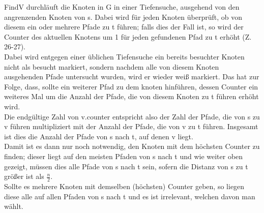 \documentclass[fleqn]{article}
\begin{document}
FindV durchläuft die Knoten in G in einer Tiefensuche, ausgehend von den angrenzenden Knoten von s. Dabei wird für jeden Knoten überprüft, ob von diesem ein oder mehrere Pfade zu t führen; falls dies der Fall ist, so wird der Counter des aktuellen Knotens um 1 für jeden gefundenen Pfad zu t erhöht (Z. 26-27). \\
Dabei wird entgegen einer üblichen Tiefensuche ein bereits besuchter Knoten nicht als besucht markiert, sondern nachdem alle von diesem Knoten ausgehenden Pfade untersucht wurden, wird er wieder weiß markiert. Das hat zur Folge, dass, sollte ein weiterer Pfad zu dem knoten hinführen, dessen Counter ein weiteres Mal um die Anzahl der Pfade, die von diesem Knoten zu t führen erhöht wird.\\
Die endgültige Zahl von v.counter entspricht also der Zahl der Pfade, die von s zu v führen multipliziert mit der Anzahl der Pfade, die von v zu t führen. Insgesamt ist dies die Anzahl der Pfade von s nach t, auf denen v liegt.\\
Damit ist es dann nur noch notwendig, den Knoten mit dem höchsten Counter zu finden; dieser liegt auf den meisten Pfaden von s nach t und wie weiter oben gezeigt, müssen dies alle Pfade von s nach t sein, sofern die Distanz von s zu t größer ist als $\frac{n}{2}$.\\
Sollte es mehrere Knoten mit demselben (höchsten) Counter geben, so liegen diese alle auf allen Pfaden von s nach t und es ist irrelevant, welchen davon man wählt.\\

\section{}%
\subsection{}%
\end{document}
